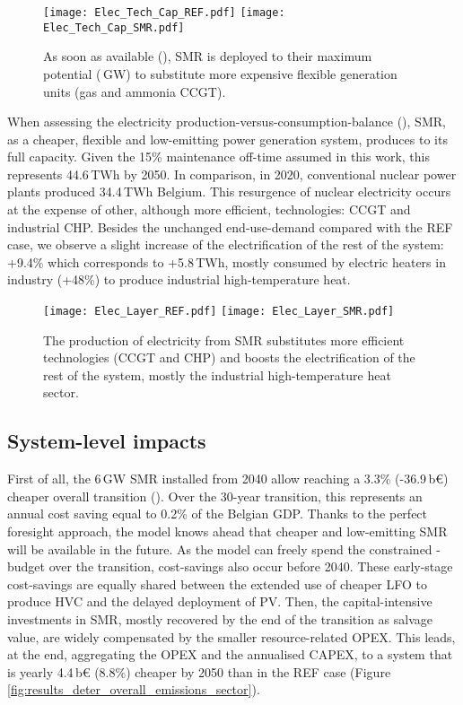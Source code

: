 \begin{figure}[htbp!]
\centering
\texttt{[image: Elec\_Tech\_Cap\_REF.pdf]}
\texttt{[image: Elec\_Tech\_Cap\_SMR.pdf]}
\caption{As soon as available (), \acrfull{SMR} is deployed to their maximum potential (\,GW) to substitute more expensive flexible generation units (\ie gas and ammonia \gls{CCGT}).}
\label{fig:results_deter_tech_cap_elec}
\end{figure}

\newpage
When assessing the electricity production-versus-consumption-balance (), \gls{SMR}, as a cheaper, flexible and low-emitting power generation system, produces to its full capacity. Given the 15\% maintenance off-time assumed in this work, this represents 44.6\,TWh by 2050. In comparison, in 2020, conventional nuclear power plants produced 34.4\,TWh Belgium. This resurgence of nuclear electricity occurs at the expense of other, although more efficient, technologies: \gls{CCGT} and industrial \gls{CHP}. Besides the unchanged end-use-demand compared with the REF case, we observe a slight increase of the electrification of the rest of the system: +9.4\% which corresponds to +5.8\,TWh, mostly consumed by electric heaters in industry (+48\%) to produce industrial high-temperature heat.

\begin{figure}[htbp!]
\centering
\texttt{[image: Elec\_Layer\_REF.pdf]}
\texttt{[image: Elec\_Layer\_SMR.pdf]}
\caption{The production of electricity from \gls{SMR} substitutes more efficient technologies (\ie \gls{CCGT} and \gls{CHP}) and boosts the electrification of the rest of the system, mostly the industrial high-temperature heat sector.}
\label{fig:results_deter_layer_elec}
\end{figure}

\newpage
\subsection{System-level impacts}
\label{subsec:atom_mol:results_deter_overall}
First of all, the 6\,GW \gls{SMR} installed from 2040 allow reaching a 3.3\% (-36.9\,b€) cheaper overall transition (). Over the 30-year transition, this represents an annual cost saving equal to 0.2\% of the Belgian GDP. Thanks to the perfect foresight approach, the model knows ahead that cheaper and low-emitting \gls{SMR} will be available in the future. As the model can freely spend the constrained -budget over the transition, cost-savings also occur before 2040. These early-stage cost-savings are equally shared between the extended use of cheaper \gls{LFO} to produce \gls{HVC} and the delayed deployment of \gls{PV}. Then, the capital-intensive investments in \gls{SMR}, mostly recovered by the end of the transition as salvage value, are widely compensated by the smaller resource-related OPEX. This leads, at the end, aggregating the OPEX and the annualised CAPEX, to a system that is yearly 4.4\,b€ (8.8\%) cheaper by 2050 than in the REF case (Figure \ref{fig:results_deter_overall_emissions_sector}).

